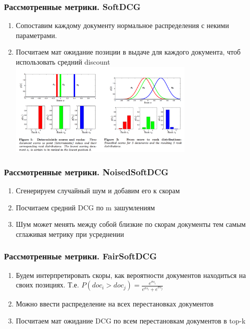 \documentclass[10pt]{beamer}
\begin{document}
\begin{frame}
\frametitle{Рассмотренные метрики. SoftDCG}
\begin{enumerate}
\item Сопоставим каждому документу нормальное распределения с некими параметрами.
\item Посчитаем мат ожидание позиции в выдаче для каждого документа, чтоб использовать 
средний discount \cite{SoftDCGPaper}
\includegraphics[width=3.5in]{SoftDCG}
\end{enumerate}
\end{frame}


\begin{frame}
\frametitle{Рассмотренные метрики. NoisedSoftDCG}
\begin{enumerate}
\item Сгенерируем случайный шум и добавим его к скорам
\item Посчитаем средний DCG по m зашумлениям
\item Шум может менять между собой близкие по скорам документы тем самым 
сглаживая метрику при усреднении
\end{enumerate}
\end{frame}


\begin{frame}
\frametitle{Рассмотренные метрики. FairSoftDCG}
\begin{enumerate}
\item Будем интерпретировать скоры, как вероятности документов находиться на своих позициях.
Т.е. $P(doc_i > doc_j) = \frac{e^{\sigma s_i}}{e^{\sigma s_i} + e^{\sigma s_j}}$
\item Можно ввести распределение на всех перестановках документов 
\item Посчитаем мат ожидание DCG по всем перестановкам документов в top-k
\end{enumerate}
\end{frame}
\end{document}
